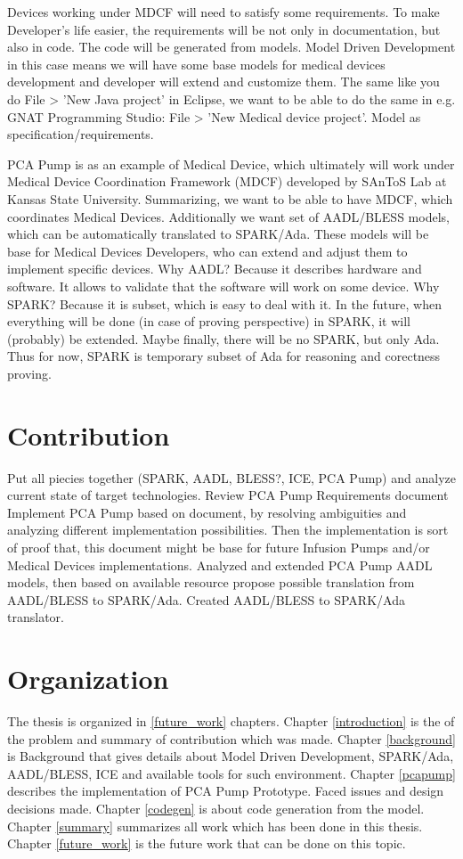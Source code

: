 Devices working under MDCF will need to satisfy some requirements. To make Developer's life easier, the requirements will be not only in documentation, but also in code. The code will be generated from models.
Model Driven Development in this case means we will have some base models for medical devices development and developer will extend and customize them. The same like you do File > 'New Java project' in Eclipse, we want to be able to do the same in e.g. GNAT Programming Studio: File > 'New Medical device project'.
Model as specification/requirements.

PCA Pump is as an example of Medical Device, which ultimately will work under Medical Device Coordination Framework (MDCF) developed by SAnToS Lab at Kansas State University.
Summarizing, we want to be able to have MDCF, which coordinates Medical Devices. Additionally we want set of AADL/BLESS models, which can be automatically translated to SPARK/Ada. These models will be base for Medical Devices Developers, who can extend and adjust them to implement specific devices. 
Why AADL? Because it describes hardware and software. It allows to validate that the software will work on some device.
Why SPARK? Because it is subset, which is easy to deal with it. In the future, when everything will be done (in case of proving perspective) in SPARK, it will (probably) be extended. Maybe finally, there will be no SPARK, but only Ada. Thus for now, SPARK is temporary subset of Ada for reasoning and corectness proving.

\section{Contribution}
\label{introduction:contribution}
Put all piecies together (SPARK, AADL, BLESS?, ICE, PCA Pump) and analyze current state of target technologies.
Review PCA Pump Requirements document
Implement PCA Pump based on document, by resolving ambiguities and analyzing different implementation possibilities. Then the implementation is sort of proof that, this document might be base for future Infusion Pumps and/or Medical Devices implementations.
Analyzed and extended PCA Pump AADL models, then based on available resource propose possible translation from AADL/BLESS to SPARK/Ada.
Created AADL/BLESS to SPARK/Ada translator.

\section{Organization}
\label{introduction:organization}
The thesis is organized in \ref{future_work} chapters. 
Chapter \ref{introduction} is the of the problem and summary of contribution which was made. 
Chapter \ref{background} is Background that gives details about Model Driven Development, SPARK/Ada, AADL/BLESS, ICE and available tools for such environment. 
Chapter \ref{pcapump} describes the implementation of PCA Pump Prototype. Faced issues and design decisions made.
Chapter \ref{codegen} is about code generation from the model. 
Chapter \ref{summary} summarizes all work which has been done in this thesis. 
Chapter \ref{future_work} is the future work that can be done on this topic.
